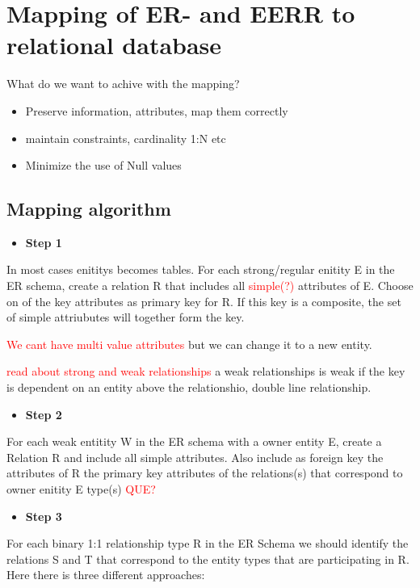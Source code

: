 
\section{Mapping of ER- and EERR to relational database}
What do we want to achive with the mapping?

\begin{itemize}
	\item Preserve information, attributes, map them correctly 
	\item maintain constraints, cardinality 1:N etc
	\item Minimize the use of Null values
\end{itemize}

\subsection*{Mapping algorithm}
\begin{itemize}
	\item \textbf{Step 1}
\end{itemize}
In most cases enititys becomes tables. 
For each strong/regular enitity E in the ER schema, create a relation R that includes all \textcolor{red}{simple(?)} attributes of E. Choose on of the key attributes as primary key for R. If this key is a composite, the set of simple attriubutes will together form the key.

\textcolor{red}{We cant have multi value attributes} but we can change it to a new entity. 

\textcolor{red}{read about strong and weak relationships} a weak relationships is weak if the key is dependent on an entity above the relationshio, double line relationship.



\begin{itemize}
	\item \textbf{Step 2}
\end{itemize}
For each weak entitity W in the ER schema with a owner entity E, create a Relation R and include all simple attributes. Also include as foreign key the attributes of R the primary key attributes of the relations(s) that correspond to owner enitity E type(s) \textcolor{red}{QUE?}  

\begin{itemize}
	\item \textbf{Step 3}
\end{itemize}
For each binary 1:1 relationship type R in the ER Schema we should identify the relations S and T that correspond to the entity types that are participating in R. Here there is three different approaches: 

